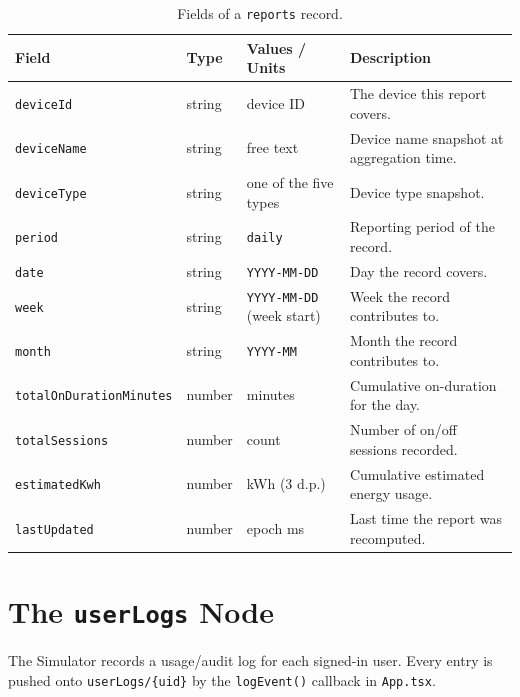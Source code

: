 \documentclass[11pt,a4paper]{article}
\begin{document}
\begin{table}[H]
\centering
\caption{Fields of a \texttt{reports} record.}
\label{tab:reports}
\begin{tabularx}{\textwidth}{@{}l l X X@{}}
\toprule
\textbf{Field} & \textbf{Type} & \textbf{Values / Units} & \textbf{Description} \\
\midrule
\texttt{deviceId} & string & device ID & The device this report covers. \\
\texttt{deviceName} & string & free text & Device name snapshot at aggregation time. \\
\texttt{deviceType} & string & one of the five types & Device type snapshot. \\
\texttt{period} & string & \texttt{daily} & Reporting period of the record. \\
\texttt{date} & string & \texttt{YYYY-MM-DD} & Day the record covers. \\
\texttt{week} & string & \texttt{YYYY-MM-DD} (week start) & Week the record contributes to. \\
\texttt{month} & string & \texttt{YYYY-MM} & Month the record contributes to. \\
\texttt{totalOnDurationMinutes} & number & minutes & Cumulative on-duration for the day. \\
\texttt{totalSessions} & number & count & Number of on/off sessions recorded. \\
\texttt{estimatedKwh} & number & kWh (3 d.p.) & Cumulative estimated energy usage. \\
\texttt{lastUpdated} & number & epoch ms & Last time the report was recomputed. \\
\bottomrule
\end{tabularx}
\end{table}

\section{The \texttt{userLogs} Node}
\label{sec:userlogs}

The Simulator records a usage/audit log for each signed-in user. Every entry is pushed onto
\texttt{userLogs/\{uid\}} by the \texttt{logEvent()} callback in \texttt{App.tsx}.
\end{document}
